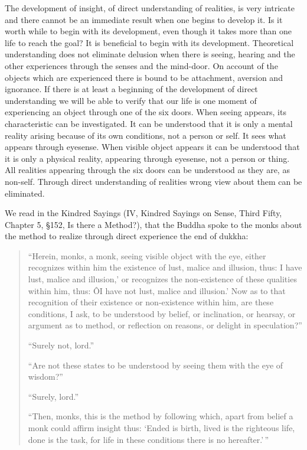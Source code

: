 \documentclass{book}
\begin{document}
The development of insight, of direct understanding of realities, is
very intricate and there cannot be an imme­diate result when one begins
to develop it. Is it worth while to begin with its development, even
though it takes more than one life to reach the goal? It is beneficial
to begin with its development. Theoretical understanding does not
eliminate delusion when there is seeing, hearing and the other
experiences through the senses and the mind-door. On account of the
objects which are experienced there is bound to be attachment, aversion
and ignorance. If there is at least a beginning of the development of
direct understanding we will be able to verify that our life is one
moment of experiencing an object through one of the six doors. When
seeing appears, its characteristic can be invest­igated. It can be
understood that it is only a mental reality arising because of its own
conditions, not a person or self. It sees what appears through
eyesense. When visible object appears it can be understood that it is
only a physical reality, appearing through eyesense, not a person or
thing. All realities appearing through the six doors can be understood
as they are, as non-self. Through direct understanding of realities
wrong view about them can be eliminated.

We read in the Kindred Sayings (IV, Kindred Sayings on Sense, Third
Fifty, Chapter 5, §152, Is there a Method?), that the Buddha spoke to
the monks about the method to realize through direct experience the end
of dukkha:

\begin{quote}
``Herein, monks, a monk, seeing visible object with the eye, either
recognizes within him the existence of lust, malice and illusion, thus:
I have lust, malice and illusion,' or recognizes the non-existence of
these qualities within him, thus: ÔI have not lust, malice and
illusion.' Now as to that recognition of their existence or
non-existence within him, are these conditions, I ask, to be understood
by belief, or inclination, or hearsay, or argument as to method, or
reflection on reasons, or delight in speculation?''

``Surely not, lord.''

``Are not these states to be understood by seeing them with the eye of
wisdom?''

``Surely, lord.''

``Then, monks, this is the method by following which, apart from belief
a monk could affirm insight thus: `Ended is birth, lived is the
righteous life, done is the task, for life in these conditions there is
no hereafter.'\,''
\end{quote}
\end{document}
